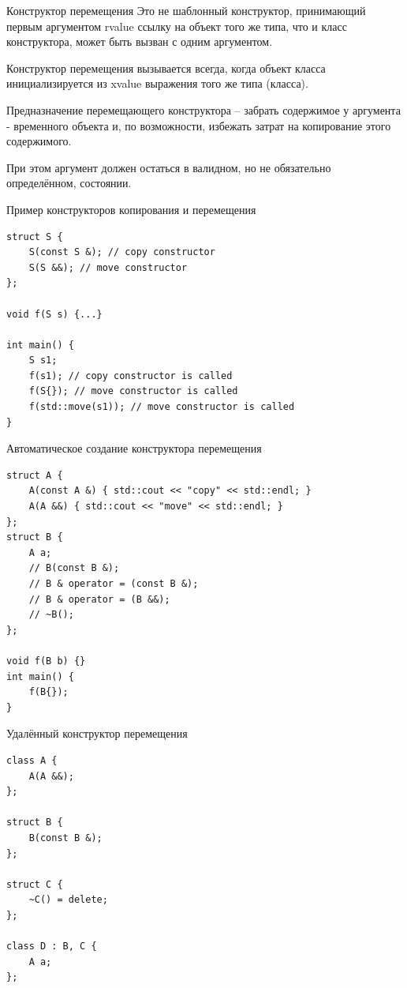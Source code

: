\documentclass[unknownkeysallowed,xcolor=table]{beamer}
\begin{document}
\begin{frame}{Конструктор перемещения}
Это не шаблонный конструктор, принимающий первым аргументом rvalue ссылку на объект того же типа, что и класс конструктора, может быть вызван с одним аргументом.

\vspace{1em}

Конструктор перемещения вызывается всегда, когда объект класса инициализируется из xvalue выражения того же типа (класса).

\vspace{1em}

Предназначение перемещающего конструктора -- забрать содержимое у аргумента - временного объекта и, по возможности, избежать затрат на копирование этого содержимого. 

При этом аргумент должен остаться в валидном, но не обязательно определённом, состоянии.
\end{frame}

\begin{frame}[fragile]{Пример конструкторов копирования и перемещения}
\begin{lstlisting}
struct S {
    S(const S &); // copy constructor
    S(S &&); // move constructor
};

void f(S s) {...}

int main() {
    S s1;
    f(s1); // copy constructor is called
    f(S{}); // move constructor is called
    f(std::move(s1)); // move constructor is called
}
\end{lstlisting}
\end{frame}

\begin{frame}[fragile]{Автоматическое создание конструктора перемещения}
\begin{lstlisting}
struct A {
    A(const A &) { std::cout << "copy" << std::endl; }
    A(A &&) { std::cout << "move" << std::endl; }
};
struct B {
    A a;
    // B(const B &);
    // B & operator = (const B &);
    // B & operator = (B &&);
    // ~B();
};

void f(B b) {}
int main() {
    f(B{});
}
\end{lstlisting}
\end{frame}

\begin{frame}[fragile]{Удалённый конструктор перемещения}
\begin{lstlisting}
class A {
    A(A &&);
};

struct B {
    B(const B &);
};

struct C {
    ~C() = delete;
};

class D : B, C {
    A a;
};
\end{lstlisting}
\end{frame}
\end{document}
